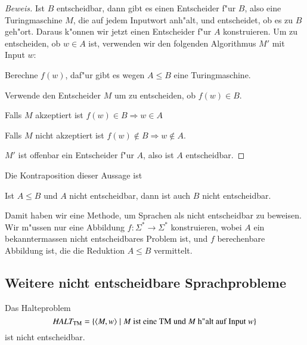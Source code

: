 \begin{proof}[Beweis]
Ist $B$ entscheidbar, dann gibt es einen Entscheider f"ur $B$, also
eine Turingmaschine $M$, die auf jedem Inputwort anh"alt, und
entscheidet, ob es zu $B$ geh"ort. Daraus k"onnen wir jetzt einen
Entscheider f"ur $A$ konstruieren. Um zu entscheiden, ob $w\in A$
ist, verwenden wir den folgenden Algorithmus $M'$ mit Input
$w$:
\medskip
\begin{compactenum}
\item Berechne $f(w)$, daf"ur gibt es wegen $A\le B$ eine Turingmaschine.
\item Verwende den Entscheider $M$ um zu entscheiden, ob $f(w)\in B$.
\item Falls $M$ akzeptiert ist $f(w)\in B\Rightarrow w\in A$
\item Falls $M$ nicht akzeptiert ist $f(w)\not\in B\Rightarrow w\not\in A$.
\end{compactenum}
\medskip
$M'$ ist offenbar ein Entscheider f"ur $A$, also ist $A$ entscheidbar.
\end{proof}

Die Kontraposition dieser Aussage ist
\begin{satz}
Ist $A\le B$ und $A$ nicht entscheidbar, dann ist auch $B$ nicht
entscheidbar.
\end{satz}
Damit haben wir eine Methode, um Sprachen als nicht entscheidbar 
zu beweisen. Wir m"ussen nur eine Abbildung $f\colon \Sigma^*\to \Sigma^*$
konstruieren, wobei $A$ ein bekanntermassen nicht
entscheidbares Problem ist, und $f$ berechenbare Abbildung ist,
die die Reduktion $A\le B$ vermittelt.

\subsection{Weitere nicht entscheidbare Sprachprobleme}
\begin{satz} Das Halteproblem
\[
\text{\it HALT}_{\text{TM}}=\{\langle M,w\rangle\;|\;
\text{$M$ ist eine TM und $M$ h"alt auf Input $w$}\}
\]
ist nicht entscheidbar.
\end{satz}

